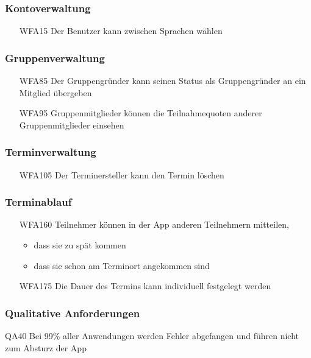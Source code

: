 \documentclass{scrartcl}
\begin{document}
		\subsubsection{Kontoverwaltung}
		\begin{itemize}
			\item[WFA15] Der Benutzer kann zwischen Sprachen wählen
		\end{itemize}
		
		\subsubsection{Gruppenverwaltung}
		\begin{itemize}
			\item[WFA85] Der Gruppengründer kann seinen Status als Gruppengründer an ein Mitglied übergeben
			\item[WFA95] Gruppenmitglieder können die Teilnahmequoten anderer Gruppenmitglieder einsehen
		\end{itemize}

	\subsubsection{Terminverwaltung}
	\begin{itemize}
		\item[WFA105] Der Terminersteller kann den Termin löschen	
	\end{itemize}

	\subsubsection{Terminablauf}
	\begin{itemize}
	\item[WFA160] Teilnehmer können in der App anderen Teilnehmern mitteilen,
		\begin{itemize}
			\item dass sie zu spät kommen
			\item dass sie schon am Terminort angekommen sind
		\end{itemize}
			\item[WFA175] Die Dauer des Termins kann individuell festgelegt werden
	\end{itemize}	

	\subsubsection{Qualitative Anforderungen}
			\item[QA40] Bei 99\% aller Anwendungen werden Fehler abgefangen und führen nicht zum Absturz der App
	
\end{document}

